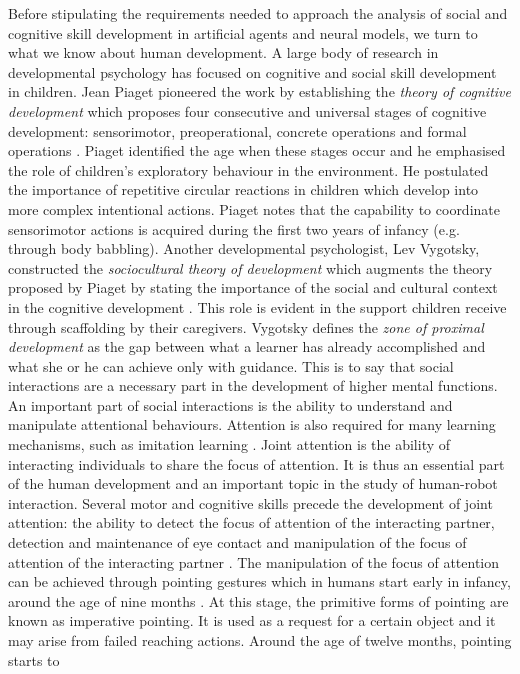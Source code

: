 Before stipulating the requirements needed to approach the analysis of social 
and cognitive skill development in artificial agents and neural models, we turn 
to what we know about human development. A large body of research in 
developmental psychology has focused on cognitive and social skill development 
in children. Jean Piaget pioneered the work by establishing the \emph{theory of 
cognitive development} which proposes four consecutive and universal stages of 
cognitive development: sensorimotor, preoperational, concrete operations and 
formal operations \citep{piaget73}. Piaget identified the age when these stages 
occur and he emphasised the role of children's exploratory behaviour in the 
environment. He postulated the importance of repetitive circular reactions in 
children which develop into more complex intentional actions. Piaget notes that 
the capability to coordinate sensorimotor actions is acquired during the first 
two years of infancy (e.g. through body babbling). 
Another developmental psychologist, Lev Vygotsky, constructed the 
\emph{sociocultural theory of development} which augments the theory proposed 
by Piaget by stating the importance of the social and cultural context in the 
cognitive development \citep{Vyg78}.
This role is evident in the support children receive through scaffolding by 
their caregivers. Vygotsky defines the \emph{zone of proximal development} as 
the gap between what a learner has already accomplished and what she or he can 
achieve only with guidance. This is to say that social interactions are a  
necessary part in the development of higher mental functions.
\newline
\phantom{x}\hspace{3ex} 
An important part of social interactions is the ability to understand and manipulate attentional behaviours. Attention is also required for many learning mechanisms, such as imitation learning \citep{Tomasello1995}. Joint attention is the ability of interacting individuals to share the focus of attention.
It is thus an essential part of the human development and an important topic in the study of human-robot interaction. Several motor and cognitive skills precede the development of joint attention: the ability to detect the focus of attention of the interacting partner, detection and maintenance of eye contact and manipulation of the focus of attention of the interacting partner \citep{Kaplan2006}. The manipulation of the focus of attention can be achieved through pointing gestures which in humans start early in infancy, around the age of nine months \citep{baron1997mindblindness}. At this stage, the primitive forms of pointing are known as imperative pointing. It is used as a request for a certain object and it may arise from failed reaching actions. Around the age of twelve months, pointing starts to 
